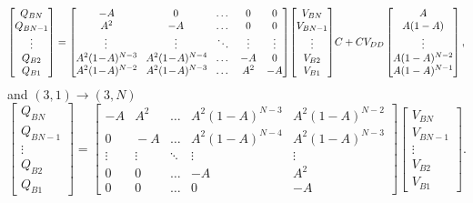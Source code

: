 \documentclass[conference]{article}
\begin{document}
	\begin{equation}
	\begin{bmatrix}
	Q_{BN} \\
	Q_{BN-1} \\
	\vdots\\
	Q_{B2} \\ 
	Q_{B1}
	\end{bmatrix}
	=
	\begin{bmatrix}
	-A \!& 0 & \dots & 0 & 0 \\
	A^2 \!& -A & \dots & 0 & 0\\
	\vdots & \vdots & \ddots & \vdots & \vdots \\
	A^2(1\!-\!A)^{N-3} \!& A^2(1\!-\!A)^{N-4} \!& \dots & -A & 0\\ 
	A^2(1\!-\!A)^{N-2} \!& A^2(1\!-\!A)^{N-3} \!& \dots & A^2 & -A 
	\end{bmatrix}\!\begin{bmatrix}
	V_{BN} \\
	V_{BN-1} \\
	\vdots \\
	V_{B2} \\
	V_{B1}
	\end{bmatrix}\!C\\+CV_{DD}\begin{bmatrix}
	A \\
	A(1-A) \\
	\vdots \\
	A(1-A)^{N-2} \\
	A(1-A)^{N-1}
	\end{bmatrix},
	\end{equation}
	and $(3,1)\rightarrow(3,N)$ 
	\begin{equation}
	\begin{bmatrix}
	Q_{BN} \\
	Q_{BN-1} \\
	\vdots\\
	Q_{B2} \\ 
	Q_{B1}
	\end{bmatrix}
	=
	\begin{bmatrix}
	-A \!& A^2 & \dots & A^2(1\!-\!A)^{N-3} & A^2(1\!-\!A)^{N-2} \\
	0 \!& \!-A & \dots & A^2(1\!-\!A)^{N-4} & A^2(1\!-\!A)^{N-3}\\
	\vdots & \vdots & \ddots & \vdots & \vdots \\
	0 \!& 0 \!& \dots & -A & A^2\\ 
	0 \!& 0 \!& \dots & 0 & -A 
	\end{bmatrix}\!\begin{bmatrix}
	V_{BN} \\
	V_{BN-1} \\
	\vdots \\
	V_{B2} \\
	V_{B1}
	\end{bmatrix}.
	\end{equation}
\end{document}
